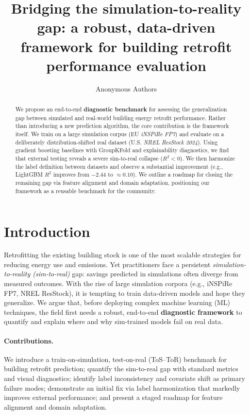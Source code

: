 \documentclass{article}
\title{Bridging the simulation-to-reality gap: a robust, data-driven framework for building retrofit performance evaluation}
\author{Anonymous Authors}
\begin{document}
\maketitle

\begin{abstract}
We propose an end-to-end \textbf{diagnostic benchmark} for assessing the generalization gap between simulated and real-world building energy retrofit performance. Rather than introducing a new prediction algorithm, the core contribution is the framework itself. We train on a large simulation corpus (EU \emph{iNSPiRe FP7}) and evaluate on a deliberately distribution-shifted real dataset (U.S. \emph{NREL ResStock 2024}). Using gradient boosting baselines with GroupKFold and explainability diagnostics, we find that external testing reveals a severe sim-to-real collapse ($R^2<0$). We then harmonize the label definition between datasets and observe a substantial improvement (e.g., LightGBM $R^2$ improves from $-2.44$ to $\approx0.10$). We outline a roadmap for closing the remaining gap via feature alignment and domain adaptation, positioning our framework as a reusable benchmark for the community.
\end{abstract}

\section{Introduction}
Retrofitting the existing building stock is one of the most scalable strategies for reducing energy use and emissions. Yet practitioners face a persistent \emph{simulation-to-reality (sim-to-real)} gap: savings predicted in simulations often diverge from measured outcomes. With the rise of large simulation corpora (e.g., iNSPiRe FP7, NREL ResStock), it is tempting to train data-driven models and hope they generalize. We argue that, before deploying complex machine learning (ML) techniques, the field first needs a robust, end-to-end \textbf{diagnostic framework} to quantify and explain where and why sim-trained models fail on real data.

\paragraph{Contributions.}
We introduce a train-on-simulation, test-on-real (ToS--ToR) benchmark for building retrofit prediction; quantify the sim-to-real gap with standard metrics and visual diagnostics; identify label inconsistency and covariate shift as primary failure modes; demonstrate an initial fix via label harmonization that markedly improves external performance; and present a staged roadmap for feature alignment and domain adaptation.
\end{document}
